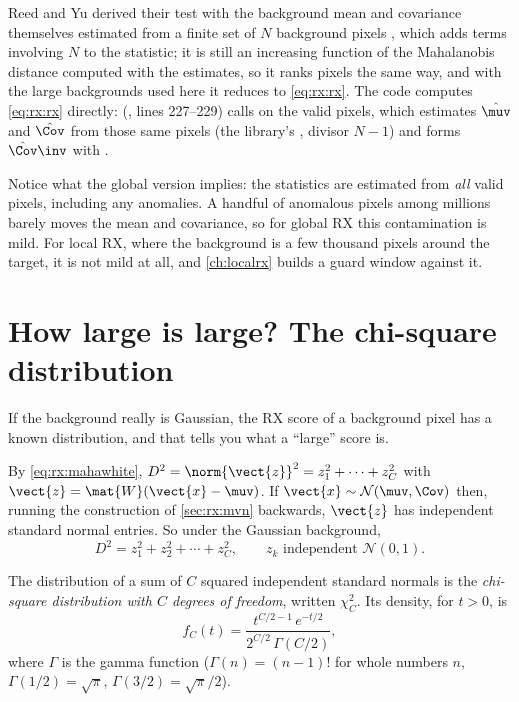 \begin{sourcenote}
Reed and Yu derived their test with the background mean and covariance themselves estimated from a
finite set of $N$ background pixels \citep{reed1990adaptive}, which adds terms involving $N$ to the
statistic; it is still an increasing function of the Mahalanobis distance computed with the
estimates, so it ranks pixels the same way, and with the large backgrounds used here it reduces to
\cref{eq:rx:rx}. The code computes \cref{eq:rx:rx} directly: 
(, lines 227--229) calls  on the valid
pixels, which estimates $\hat\muv$ and $\hat\Cov$ from those same pixels (the 
library's , divisor $N - 1$) and forms $\hat\Cov\inv$ with .
\end{sourcenote}

Notice what the global version implies: the statistics are estimated from \emph{all} valid pixels,
including any anomalies. A handful of anomalous pixels among millions barely moves the mean and
covariance, so for global RX this contamination is mild. For local RX, where the background is a
few thousand pixels around the target, it is not mild at all, and \cref{ch:localrx} builds a guard
window against it.

\section{How large is large? The chi-square distribution}\label{sec:rx:chi2}

If the background really is Gaussian, the RX score of a background pixel has a known distribution,
and that tells you what a ``large'' score is.

By \cref{eq:rx:mahawhite}, $D^2 = \norm{\vect{z}}^2 = z_1^2 + \cdots + z_C^2$ with
$\vect{z} = \mat{W}(\vect{x} - \muv)$. If $\vect{x} \sim \mathcal{N}(\muv, \Cov)$ then, running the
construction of \cref{sec:rx:mvn} backwards, $\vect{z}$ has independent standard normal entries. So
under the Gaussian background,
\begin{equation}\label{eq:rx:chi2sum}
D^2 = z_1^2 + z_2^2 + \cdots + z_C^2,\qquad z_k \text{ independent } \mathcal{N}(0, 1).
\end{equation}

\begin{definition}
The distribution of a sum of $C$ squared independent standard normals is the \emph{chi-square
distribution with $C$ degrees of freedom}, written $\chi^2_C$. Its density, for $t > 0$, is
\begin{equation}\label{eq:rx:chi2pdf}
f_C(t) = \frac{t^{C/2 - 1}\,e^{-t/2}}{2^{C/2}\,\Gamma(C/2)},
\end{equation}
where $\Gamma$ is the gamma function ($\Gamma(n) = (n-1)!$ for whole numbers $n$,
$\Gamma(1/2) = \sqrt\pi$, $\Gamma(3/2) = \sqrt\pi/2$).
\end{definition}


